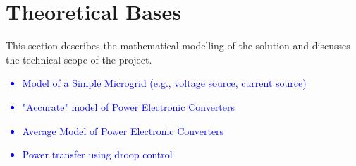 \chapter{Theoretical Bases}

This section describes the mathematical modelling of the solution and discusses the technical scope of the project.

\textcolor{blue}{
\begin{itemize}
    \item Model of a Simple Microgrid (e.g., voltage source, current source)
    \item "Accurate" model of Power Electronic Converters
    \item Average Model of Power Electronic Converters
    \item Power transfer using droop control
\end{itemize}
}

\begin{comment}

\section{The Average Model of Power Electronic Converters}

Power electronic converters are operated by switching transistors at frequencies in kHz. This switching causes harmonics, which can cause complications in modelling and simulating the converters' behaviour. Average models can thus be used to simplify the description and simulation of the converters \cite{Jankovic_Averaged_Model}.

\section{Project Definitions} \label{Theoretical_Bases_Project_Scope}

(This section will be expanded upon). 

\end{comment}